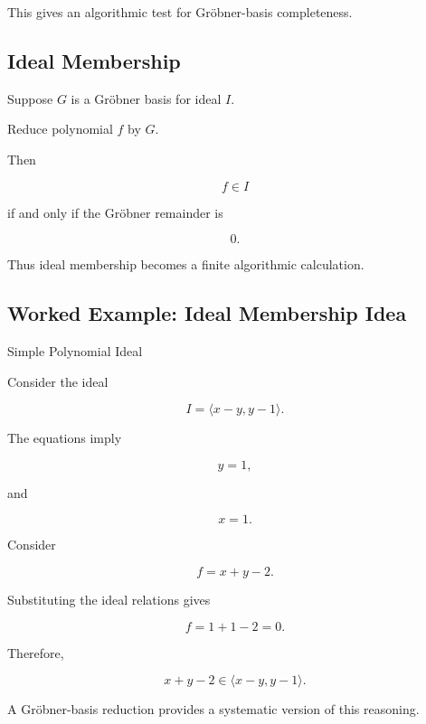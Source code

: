 This gives an algorithmic test for Gröbner-basis completeness.

\subsection{Ideal Membership}
\label{subsec:ideal-membership}

Suppose \(G\) is a Gröbner basis for ideal \(I\).

Reduce polynomial \(f\) by \(G\).

Then

\[
\boxed{
f\in I
}
\]

if and only if the Gröbner remainder is

\[
\boxed{
0.
}
\]

Thus ideal membership becomes a finite algorithmic calculation.

\subsection{Worked Example: Ideal Membership Idea}
\label{subsec:worked-ideal-membership}

\begin{workedexamplebox}{Simple Polynomial Ideal}

Consider the ideal

\[
I
=
\langle
x-y,
y-1
\rangle.
\]

The equations imply

\[
y=1,
\]

and

\[
x=1.
\]

Consider

\[
f=x+y-2.
\]

Substituting the ideal relations gives

\[
f
=
1+1-2
=
0.
\]

Therefore,

\begin{answerbox}
\[
\boxed{
x+y-2
\in
\langle
x-y,y-1
\rangle.
}
\]
\end{answerbox}

A Gröbner-basis reduction provides a systematic version of this reasoning.

\end{workedexamplebox}

